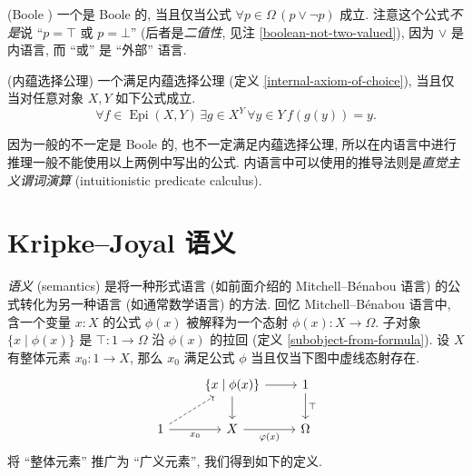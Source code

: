 \begin{example}
	[label={internal-Boolean-topos}]
	{(Boole \topos{})}
	一个\topos{}是 Boole 的, 当且仅当公式 $\forall p\in\Omega\, (p\lor \neg p)$ 成立.
	注意这个公式\emph{不是}说 ``$p=\top$ 或 $p=\bot$'' (后者是\emph{二值性}, 见注 \ref{boolean-not-two-valued}), 因为 $\lor$ 是内语言, 而 ``或'' 是 ``外部'' 语言.
\end{example}

\begin{example}
	{(内蕴选择公理)}
	一个\topos{}满足内蕴选择公理 (定义 \ref{internal-axiom-of-choice}), 当且仅当对任意对象 $X,Y$ 如下公式成立.
	\[
	\forall f\in\operatorname{Epi}(X,Y)\, \exists g\in X^Y\, \forall y\in Y\, f(g(y))=y.
	\]
\end{example}

因为一般的\topos{}不一定是 Boole 的, 也不一定满足内蕴选择公理, 所以在内语言中进行推理一般不能使用以上两例中写出的公式.
内语言中可以使用的推导法则是\emph{直觉主义谓词演算} (intuitionistic predicate calculus).



\label{logical-functor-internal}

\section{Kripke--Joyal 语义}

\emph{语义} (semantics) 是将一种形式语言 (如前面介绍的 Mitchell--B\'enabou 语言) 的公式转化为另一种语言 (如通常数学语言) 的方法. 回忆 Mitchell--B\'enabou 语言中, 含一个变量 $x\colon X$ 的公式 $\phi(x)$ 被解释为一个态射 $\phi(x) \colon X \to \Omega$.
子对象 $\{x \mid \phi(x)\}$ 是 $\top\colon 1\to\Omega$ 沿 $\phi(x)$ 的拉回 (定义 \ref{subobject-from-formula}).
设 $X$ 有整体元素 $x_0\colon 1\to X$, 那么 $x_0$ 满足公式 $\phi$ 当且仅当下图中虚线态射存在.
\[\begin{tikzcd}[ampersand replacement=\&]
	\& {\{x\mid\phi(x)\}} \& 1 \\
	1 \& X \& \Omega
	\arrow[from=1-2, to=2-2]
	\arrow["{x_0}"', from=2-1, to=2-2]
	\arrow["{\varphi(x)}"', from=2-2, to=2-3]
	\arrow[dashed, from=2-1, to=1-2]
	\arrow[from=1-2, to=1-3]
	\arrow["\top", from=1-3, to=2-3]
\end{tikzcd}\]
将 ``整体元素'' 推广为 ``广义元素'', 我们得到如下的定义.

